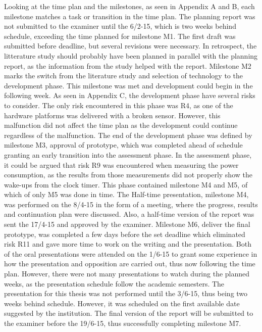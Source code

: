 Looking at the time plan and the milestones,
	as seen in Appendix A and B,
	each milestone matches a task or transition in the time plan.
The planning report was not submitted to the examiner until the 6/2-15,
	which is two weeks behind schedule,
	exceeding the time planned for milestone M1.
The first draft was submitted before deadline,
	but several revisions were necessary.
In retrospect,
	the litterature study should probably have been planned in parallel with the planning report,
	as the information from the study helped with the report.
Milestone M2 marks the switch from the literature study and selection of technology to the development phase.
This milestone was met and development could begin in the following week.
As seen in Appendix C,
	the development phase have several risks to consider.
The only risk encountered in this phase was R4,
	as one of the hardware platforms was delivered with a broken sensor.
However,
	this malfunction did not affect the time plan as the development could continue regardless of the malfunction.
The end of the development phase was defined by milestone M3,
	approval of prototype,
	which was completed ahead of schedule granting an early transition into the assessment phase.
In the assessment phase,
	it could be argued that risk R9 was encountered when measuring the power consumption,
	as the results from those measurements did not properly show the wake-ups from the clock timer.
This phase contained milestone M4 and M5,
	of which of only M5 was done in time.
The Half-time presentation,
	milestone M4,
	was performed on the 8/4-15 in the form of a meeting,
	where the progress,
	results and continuation plan were discussed.
Also,
	a half-time version of the report was sent the 17/4-15 and approved by the examiner.
Milestone M6,
	deliver the final prototype,
	was completed a few days before the set deadline which eliminated risk R11 and gave more time to work on the writing and the presentation.
Both of the oral presentations were attended on the 1/6-15 to grant some experience in how the presentation and opposition are carried out,
	thus now following the time plan.
However,
	there were not many presentations to watch during the planned weeks,
	as the presentation schedule follow the academic semesters.
The presentation for this thesis was not performed until the 3/6-15,
	thus being two weeks behind schedule.
However,
	it was scheduled on the first available date suggested by the institution.
The final version of the report will be submitted to the examiner before the 19/6-15,
	thus successfully completing milestone M7.













